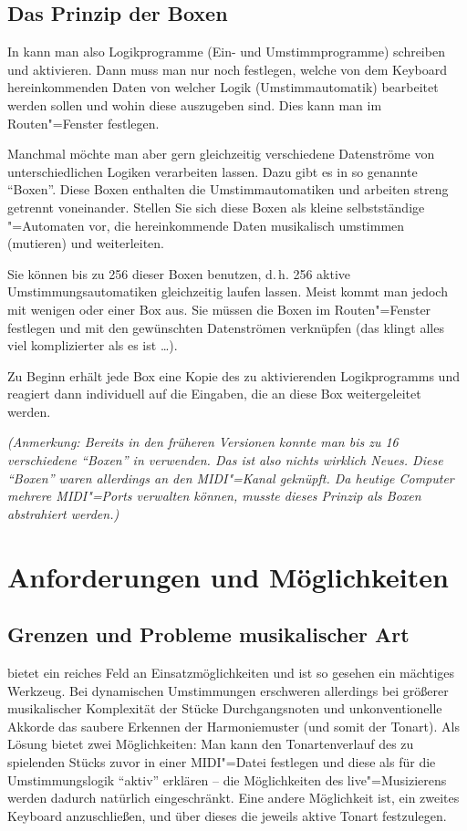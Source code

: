 \section{Das Prinzip der Boxen}\label{sec:CO_BOX}

In \mutabor{} kann man also Logikprogramme (Ein- und Umstimmprogramme)
schreiben und aktivieren. Dann muss man nur noch festlegen, welche von
dem Keyboard hereinkommenden Daten von welcher Logik
(Umstimmautomatik) bearbeitet werden sollen und wohin diese auszugeben
sind. Dies kann man im Routen"=Fenster festlegen.


Manchmal möchte man aber gern gleichzeitig verschiedene Datenströme
von unterschiedlichen Logiken verarbeiten lassen. Dazu gibt es in
\mutabor[~3] so genannte "`Boxen"'. Diese Boxen enthalten die
Umstimmautomatiken und arbeiten streng getrennt voneinander. Stellen
Sie sich diese Boxen als kleine selbstständige \mutabor{}"=Automaten
vor, die hereinkommende Daten musikalisch umstimmen (mutieren) und
weiterleiten.


Sie können bis zu 256 dieser Boxen benutzen, d.\,h. 256 aktive 
Umstimmungsautomatiken gleichzeitig laufen lassen. Meist kommt 
man jedoch mit wenigen oder einer Box aus. Sie müssen die Boxen 
im Routen"=Fenster festlegen und mit den gewünschten Datenströmen 
verknüpfen (das klingt alles viel komplizierter als es ist 
\dots ). 

Zu Beginn erhält jede Box eine Kopie des zu aktivierenden
Logikprogramms und reagiert dann individuell auf die Eingaben, die an
diese Box weitergeleitet werden.

\textit{(Anmerkung: Bereits in den früheren Versionen konnte man 
bis zu 16 verschiedene "`Boxen"' in \mutabor{} verwenden. Das ist 
also nichts wirklich Neues. Diese "`Boxen"' waren allerdings an 
den MIDI"=Kanal geknüpft. Da heutige Computer mehrere MIDI"=Ports 
verwalten können, musste dieses Prinzip als Boxen abstrahiert 
werden.)}

\chapter{Anforderungen und Möglichkeiten}
\section{Grenzen und Probleme musikalischer Art}


\mutabor{} bietet ein reiches Feld an Einsatzmöglichkeiten und ist so
gesehen ein mächtiges Werkzeug. Bei dynamischen Umstimmungen
erschweren allerdings bei größerer musikalischer Komplexität der
Stücke Durchgangsnoten und unkonventionelle Akkorde das saubere
Erkennen der Harmoniemuster (und somit der Tonart). Als Lösung bietet
\mutabor{} zwei Möglichkeiten: Man kann den Tonartenverlauf des zu
spielenden Stücks zuvor in einer MIDI"=Datei festlegen und diese als
für die Umstimmungslogik "`aktiv"' erklären -- die Möglichkeiten des
live"=Musizierens werden dadurch natürlich eingeschränkt. Eine andere
Möglichkeit ist, ein zweites Keyboard anzuschließen, und über dieses
die jeweils aktive Tonart festzulegen.


